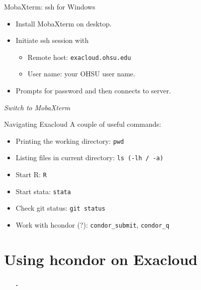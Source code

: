 \documentclass[12pt,t,xcolor=table]{beamer}
\begin{document}
\begin{frame}[fragile,label={sec:orgheadline7}]{MobaXterm: ssh for Windows}
 \begin{itemize}
\item Install MobaXterm on desktop.

\item Initiate ssh session with 
\begin{itemize}
\item Remote host: \texttt{exacloud.ohsu.edu}
\item User name: your OHSU user name.
\end{itemize}

\item Prompts for password and then connects to server.
\end{itemize}


\emph{Switch to MobaXterm}
\end{frame}

\begin{frame}[fragile,label={sec:orgheadline8}]{Navigating Exacloud}
 A couple of useful commands:

\begin{itemize}
\item Printing the working directory: \texttt{pwd}

\item Listing files in current directory: \texttt{ls (-lh / -a)}

\item Start R: \texttt{R}

\item Start stata: \texttt{stata}

\item Check git status: \texttt{git status}

\item Work with hcondor (?): \texttt{condor\_submit}, \texttt{condor\_q}
\end{itemize}
\end{frame}
\section{Using hcondor on Exacloud}
\label{sec:orgheadline10}
\begin{frame}[c]{}
  \begin{itemize}
    \item[\bf\thesection.] \bf\insertsection
  \end{itemize}          
\end{frame}
\end{document}
